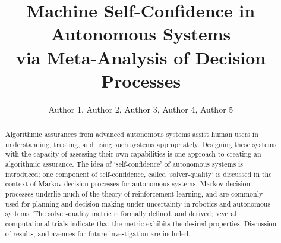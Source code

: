 \documentclass[sigconf,authordraft]{acmart}
\newcommand{\hlr}[1]{{\color{red} #1}}
\newcommand{\nisar}[1]{\hlr{NRA: #1}}
\begin{document}
\title{Machine Self-Confidence in Autonomous Systems \\ via  Meta-Analysis of Decision Processes}%
\author{Author 1, Author 2, Author 3, Author 4, Author 5} %
\begin{abstract}
    Algorithmic assurances from advanced autonomous systems assist human users in understanding, trusting, and using such systems appropriately. Designing these systems with the capacity of assessing their own capabilities is one approach to creating an algorithmic assurance. The idea of `self-confidence' of autonomous systems is introduced; one component of self-confidence, called `solver-quality' is discussed in the context of Markov decision processes for autonomous systems. Markov decision processes underlie much of the theory of reinforcement learning, and are commonly used for planning and decision making under uncertainty in robotics and autonomous systems. The solver-quality metric is formally defined, and derived; several computational trials indicate that the metric exhibits the desired properties. Discussion of results, and avenues for future investigation are included. %
\end{abstract}
\maketitle









%
\end{document}
